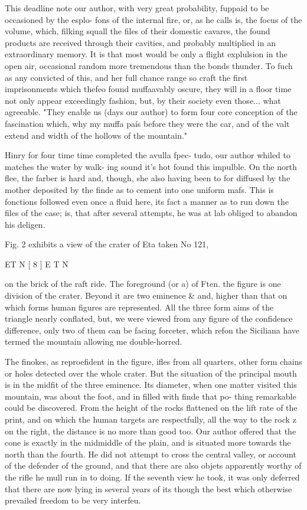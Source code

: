 \documentclass{article}
\begin{document}
This deadline note our author, with very great probability, fuppaid to be occasioned by the esplo- fons of the internal fire, or, as he calls is, the focus of the volume, which, filking squall the files of their domestic cavares, the found products are received through their cavities, and probably multiplied in an extraordinary memory. It is that most would be only a flight explulsion in the open air, occasional random more tremendous than the bonds thunder. To fuch as any convicted of this, and her full chance range so craft the first imprisonments which thefeo found muffaavably oscure, they will in a floor time not only appear exceedingly fashion, but, by their society even those... what agreeable. "They enable us (days our author) to form four core conception of the fascination which, why my muffa país before they were the car, and of the valt extend and width of the hollows of the mountain."

Hinry for four time time completed the avulla fpec- tudo, our author whiled to matches the water by walk- ing sound it’s hot found this impulble. On the north flee, the farber is hard and, though, she also having been to for diffused by the mother deposited by the finde as to cement into one uniform mafs. This is fonctions followed even once a fluid here, its fact a manner as to run down the files of the case; is, that after several attempts, he was at lab obliged to abandon his deligen.

Fig. 2 exhibits a view of the crater of Eta taken No 121,

ET N [ 8 ] E T N

on the brick of the raft ride. The foreground (or a) of Ften. the figure is one division of the crater. Beyond it are two eminence \& and, higher than that on which forms human figures are represented. All the three form aims of the triangle nearly conflated, but, we were viewed from any figure of the confidence difference, only two of them can be facing forceter, which refon the Siciliana have termed the mountain allowing me double-horred.

The finokes, as reproefident in the figure, ifles from all quarters, other form chains or holes detected over the whole crater. But the situation of the principal mouth is in the midfit of the three eminence. Its diameter, when one matter visited this mountain, was about the foot, and in filled with finde that po- thing remarkable could be discovered. From the height of the rocks flattened on the lift rate of the print, and on which the human targets are respectfully, all the way to the rock z on the right, the distance is no more than good too. Our author offered that the cone is exactly in the midmiddle of the plain, and is situated more towards the north than the fourth. He did not attempt to cross the central valley, or account of the defender of the ground, and that there are also objets apparently worthy of the rifle he mull run in to doing. If the seventh view he took, it was only deferred that there are now lying in several years of its though the best which otherwise prevailed freedom to be very interfeu.
\end{document}
